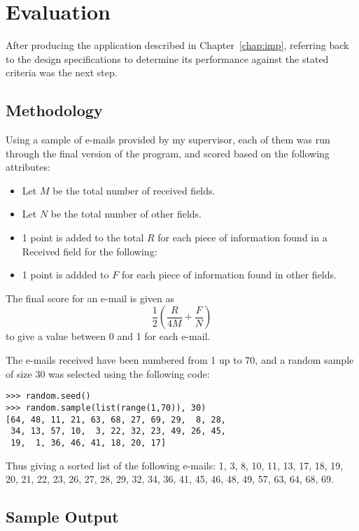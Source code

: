 \chapter{Evaluation}\label{chap:test}
After producing the application described in Chapter~\ref{chap:imp}, referring
back to the design specifications to determine its performance against the
stated criteria was the next step.  

\section{Methodology}
Using a sample of e-mails provided by my supervisor, each of them was run
through the final version of the program, and scored based on the following
attributes:

\begin{itemize}
\item Let $M$ be the total number of received fields.
\item Let $N$ be the total number of other fields.
\item 1 point is added to the total $R$ for each piece of information found in a Received field for the following:
\item 1 point is addded to $F$ for each piece of information found in other fields.
\end{itemize}

The final score for an e-mail is given as \[\frac12\left(\frac R{4M}+\frac
FN\right)\]to give a value between 0 and 1 for each e-mail.

The e-mails received have been numbered from 1 up to 70, and a random sample of
size 30 was selected using the following code:

\begin{verbatim}
>>> random.seed()
>>> random.sample(list(range(1,70)), 30)
[64, 48, 11, 21, 63, 68, 27, 69, 29,  8, 28,
 34, 13, 57, 10,  3, 22, 32, 23, 49, 26, 45,
 19,  1, 36, 46, 41, 18, 20, 17]
\end{verbatim}

Thus giving a sorted list of the following e-mails: 1, 3, 8, 10, 11, 13, 17,
18, 19, 20, 21, 22, 23, 26, 27, 28, 29, 32, 34, 36, 41, 45, 46, 48, 49, 57, 63,
64, 68, 69.

\section{Sample Output}

